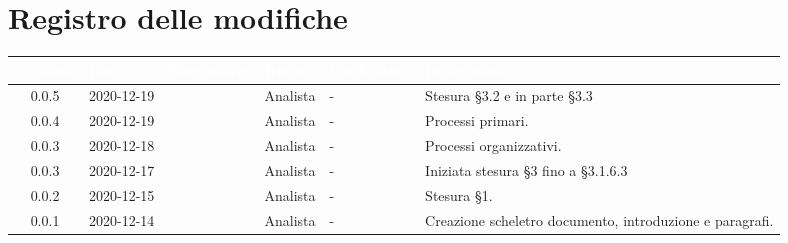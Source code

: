 \section*{Registro delle modifiche}
{
\renewcommand{\arraystretch}{1.5}
\centering
\begin{longtable}{c C{2.6cm} C{2.6cm} C{2.6cm} C{2.6cm} C{3.5cm}}
\textcolor{white}{\textbf{Versione}}&
\textcolor{white}{\textbf{Data}}&
\textcolor{white}{\textbf{Nominativo}}&
\textcolor{white}{\textbf{Ruolo}}&
\textcolor{white}{\textbf{Verificatore}}&
\textcolor{white}{\textbf{Descrizione}}\\	
\endhead

0.0.5 & 2020-12-19 & \RA{} & Analista & - & Stesura \S 3.2 e in parte \S 3.3 \\
0.0.4 & 2020-12-19 & \ZM{} & Analista & - & Processi primari. \\
0.0.3 & 2020-12-18 & \SH{} & Analista & - & Processi organizzativi. \\
0.0.3 & 2020-12-17 & \PA{} & Analista & - & Iniziata stesura \S 3 fino a \S 3.1.6.3 \\
0.0.2 & 2020-12-15 & \PA{} & Analista & - & Stesura \S 1. \\
0.0.1 & 2020-12-14 & \ZM{} & Analista & - & Creazione scheletro documento, introduzione e paragrafi. \\
		
\end{longtable}
}
